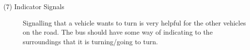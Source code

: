 \begin{description}
    \item[(7) Indicator Signals]
    Signalling that a vehicle wants to turn is very helpful for the other vehicles on the road. The bus should have some way of indicating to the surroundings that it is turning/going to turn.
    
\end{description}









